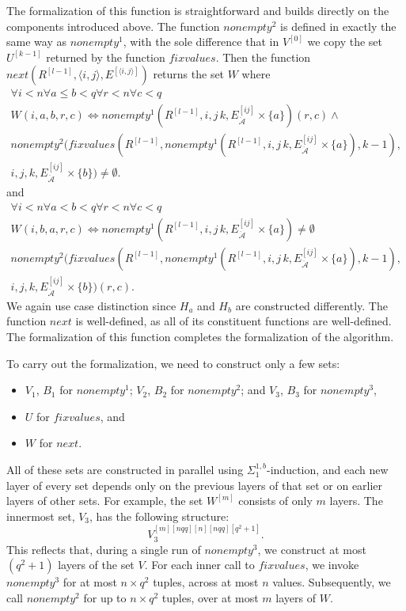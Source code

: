 \documentclass{article}
\theoremstyle{definition}
\theoremstyle{theorem}
\theoremstyle{theorem}
\theoremstyle{remark}
\theoremstyle{remark}
\theoremstyle{example}
\theoremstyle{notation}
\theoremstyle{theorem}
\begin{document}
The formalization of this function is straightforward and builds directly on the components introduced above. The function $nonempty^2$ is defined in exactly the same way as $nonempty^1$, with the sole difference that in $V^{[0]}$ we copy the set $U^{[k-1]}$ returned by the function $fixvalues$. Then the function $next(R^{[l-1]}, \langle i,j\rangle, E^{[\langle i,j\rangle]})$ returns the set $W$ where
\begin{equation}
    \begin{gathered}
\forall i<n\forall a \leq b< q \forall r<n\forall c<q \\W(i,a,b, r, c) \iff nonempty^1(R^{[l-1]},  i,j\,k, E^{[ij]}_{\ddot{\mathcal{A}}}\times\{a\})(r,c)\wedge \\
nonempty^2(fixvalues(R^{[l-1]},nonempty^1(R^{[l-1]},  i,j\,k, E^{[ij]}_{\ddot{\mathcal{A}}}\times\{a\}), k-1), \\ i,j,k, E^{[ij]}_{\ddot{\mathcal{A}}}\times\{b\}) \neq \emptyset.
    \end{gathered}
\end{equation}
and 
\begin{equation}
    \begin{gathered}
\forall i<n\forall a < b< q \forall r<n\forall c<q \\ W(i,b,a, r, c) \iff nonempty^1(R^{[l-1]},  i,j\,k, E^{[ij]}_{\ddot{\mathcal{A}}}\times\{a\})\neq \emptyset\\
nonempty^2(fixvalues(R^{[l-1]},nonempty^1(R^{[l-1]},  i,j\,k, E^{[ij]}_{\ddot{\mathcal{A}}}\times\{a\}), k-1), \\ i,j,k, E^{[ij]}_{\ddot{\mathcal{A}}}\times\{b\})(r,c).
    \end{gathered}
\end{equation}
We again use case distinction since $H_a$ and $H_b$ are constructed differently. The function $next$ is well-defined, as all of its constituent functions are well-defined. The formalization of this function completes the formalization of the algorithm.

To carry out the formalization, we need to construct only a few sets:
\begin{itemize}
    \item $V_1$, $B_1$ for $nonempty^1$; $V_2$, $B_2$ for $nonempty^2$; and $V_3$, $B_3$ for $nonempty^3$,
    \item $U$ for $fixvalues$, and
    \item $W$ for $next$.
\end{itemize}

All of these sets are constructed in parallel using $\Sigma^{1,b}_1$-induction, and each new layer of every set depends only on the previous layers of that set or on earlier layers of other sets. For example, the set $W^{[m]}$ consists of only $m$ layers. The innermost set, $V_3$, has the following structure: 
\[
V_3^{[m][nqq][n][nqq][q^2+1]}.
\]
This reflects that, during a single run of $nonempty^3$, we construct at most $(q^2 + 1)$ layers of the set $V$. For each inner call to $fixvalues$, we invoke $nonempty^3$ for at most $n \times q^2$ tuples, across at most $n$ values. Subsequently, we call $nonempty^2$ for up to $n \times q^2$ tuples, over at most $m$ layers of $W$.
\end{document}
